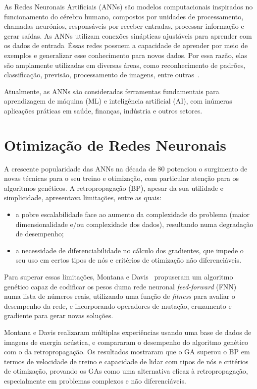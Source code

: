 As Redes Neuronais Artificiais (ANNs) são modelos computacionais inspirados no funcionamento do cérebro humano, compostos por unidades de processamento, chamadas neurónios, responsáveis por receber entradas, processar informação e gerar saídas.
As ANNs utilizam conexões sinápticas ajustáveis para aprender com os dados de entrada~\cite{Lippmann1988AnNets}\.

Essas redes possuem a capacidade de aprender por meio de exemplos e generalizar esse conhecimento para novos dados.
Por essa razão, elas são amplamente utilizadas em diversas áreas, como reconhecimento de padrões, classificação, previsão, processamento de imagens, entre outras~\cite{Jain1996ArtificialTutorial}.

Atualmente, as ANNs são consideradas ferramentas fundamentais para aprendizagem de máquina (ML) e inteligência artificial (AI), com inúmeras aplicações práticas em saúde, finanças, indústria e outros setores.


\section{Otimização de Redes Neuronais}\label{sec:optim_nns}

A crescente popularidade das ANNs na década de 80 potenciou o surgimento de novas técnicas para o seu treino e otimização, com particular atenção para os algoritmos genéticos.
A retropropagação (BP), apesar da sua utilidade e simplicidade, apresentava limitações, entre as quais:
\begin{itemize}
    \item a pobre escalabilidade face ao aumento da complexidade do problema (maior dimensionalidade e/ou complexidade dos dados), resultando numa degradação de desempenho;
    \item a necessidade de diferenciabilidade no cálculo dos gradientes, que impede o seu uso em certos tipos de nós e critérios de otimização não diferenciáveis.
\end{itemize}

Para superar essas limitações, Montana e Davis~\cite{Montana1989} propuseram um algoritmo genético capaz de codificar os pesos duma rede neuronal \textit{feed-forward} (FNN) numa lista de números reais, utilizando uma função de \textit{fitness} para avaliar o desempenho da rede, e incorporando operadores de mutação, cruzamento e gradiente para gerar novas soluções.

Montana e Davis realizaram múltiplas experiências usando uma base de dados de imagens de energia acústica, e compararam o desempenho do algoritmo genético com o da retropropagação.
Os resultados mostraram que o GA superou o BP em termos de velocidade de treino e capacidade de lidar com tipos de nós e critérios de otimização, provando os GAs como uma alternativa eficaz à retropropagação, especialmente em problemas complexos e não diferenciáveis.